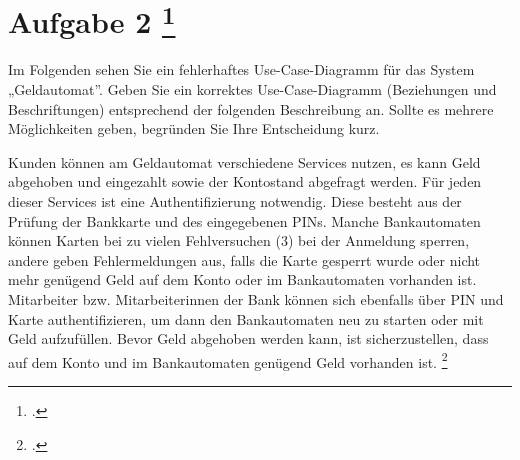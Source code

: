 \documentclass{bschlangaul-aufgabe}
\begin{document}

\section{Aufgabe 2
\footcite[Thema 1 Teilaufgabe 1 Aufgabe 2]{examen:46116:2017:03}}

Im Folgenden sehen Sie ein fehlerhaftes Use-Case-Diagramm für das System
„Geldautomat”. Geben Sie ein korrektes Use-Case-Diagramm (Beziehungen
und Beschriftungen) entsprechend der folgenden Beschreibung an. Sollte
es mehrere Möglichkeiten geben, begründen Sie Ihre Entscheidung kurz.

Kunden können am Geldautomat verschiedene Services nutzen, es kann Geld
abgehoben und eingezahlt sowie der Kontostand abgefragt werden. Für
jeden dieser Services ist eine Authentifizierung notwendig. Diese
besteht aus der Prüfung der Bankkarte und des eingegebenen PINs. Manche
Bankautomaten können Karten bei zu vielen Fehlversuchen (3) bei der
Anmeldung sperren, andere geben Fehlermeldungen aus, falls die Karte
gesperrt wurde oder nicht mehr genügend Geld auf dem Konto oder im
Bankautomaten vorhanden ist. Mitarbeiter bzw. Mitarbeiterinnen der Bank
können sich ebenfalls über PIN und Karte authentifizieren, um dann den
Bankautomaten neu zu starten oder mit Geld aufzufüllen. Bevor Geld
abgehoben werden kann, ist sicherzustellen, dass auf dem Konto und im
Bankautomaten genügend Geld vorhanden ist.
\footcite[Aufgabe 3]{sosy:ab:3}
\end{document}
